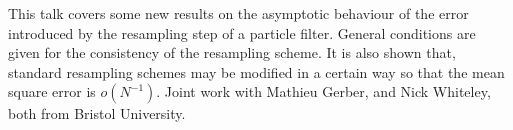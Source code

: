 This talk covers some new results on the asymptotic behaviour of the
error introduced by the resampling step of a particle filter. General
conditions are given for the consistency of the resampling scheme. It
is also shown that, standard resampling schemes may be modified in
a certain way so that the mean square error is $o(N^{-1})$.
Joint work with Mathieu Gerber, and Nick Whiteley, both from Bristol
University.